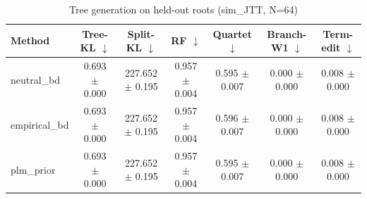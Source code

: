 \begin{table}[t]\centering
\caption{Tree generation on held-out roots (sim_JTT, N=64)}
\begin{tabular}{lcccccc}
\toprule
Method & Tree-KL $\downarrow$ & Split-KL $\downarrow$ & RF $\downarrow$ & Quartet $\downarrow$ & Branch-W1 $\downarrow$ & Term-edit $\downarrow$ \\
\midrule
neutral\_bd & 0.693 $\pm$ 0.000 & 227.652 $\pm$ 0.195 & 0.957 $\pm$ 0.004 & 0.595 $\pm$ 0.007 & 0.000 $\pm$ 0.000 & 0.008 $\pm$ 0.000 \\
empirical\_bd & 0.693 $\pm$ 0.000 & 227.652 $\pm$ 0.195 & 0.957 $\pm$ 0.004 & 0.596 $\pm$ 0.007 & 0.000 $\pm$ 0.000 & 0.008 $\pm$ 0.000 \\
plm\_prior & 0.693 $\pm$ 0.000 & 227.652 $\pm$ 0.195 & 0.957 $\pm$ 0.004 & 0.595 $\pm$ 0.007 & 0.000 $\pm$ 0.000 & 0.008 $\pm$ 0.000 \\
\bottomrule
\end{tabular}
\end{table}